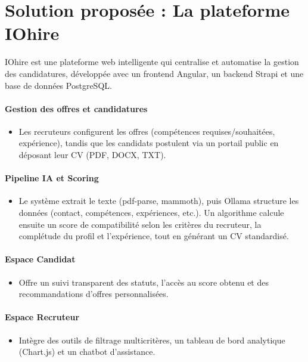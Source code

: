 \documentclass[12pt,a4paper,oneside]{report}
\begin{document}
\begin{itemize}
\begin{itemize}
  
\end{itemize}

\section{Solution proposée : La plateforme IOhire}

\noindent
IOhire est une plateforme web intelligente qui centralise et automatise la gestion des candidatures, développée avec un frontend Angular, un backend Strapi et une base de données PostgreSQL.

\paragraph{Gestion des offres et candidatures}
\begin{itemize}
    \item Les recruteurs configurent les offres (compétences requises/souhaitées, expérience), tandis que les candidats postulent via un portail public en déposant leur CV (PDF, DOCX, TXT).
\end{itemize}

\paragraph{Pipeline IA et Scoring}
\begin{itemize}
    \item Le système extrait le texte (pdf-parse, mammoth), puis Ollama structure les données (contact, compétences, expériences, etc.). Un algorithme calcule ensuite un score de compatibilité selon les critères du recruteur, la complétude du profil et l'expérience, tout en générant un CV standardisé.
\end{itemize}

\paragraph{Espace Candidat}
\begin{itemize}
    \item Offre un suivi transparent des statuts, l'accès au score obtenu et des recommandations d'offres personnalisées.
\end{itemize}

\paragraph{Espace Recruteur}
\begin{itemize}
    \item Intègre des outils de filtrage multicritères, un tableau de bord analytique (Chart.js) et un chatbot d'assistance.
\end{itemize}


\end{itemize}
\end{document}
